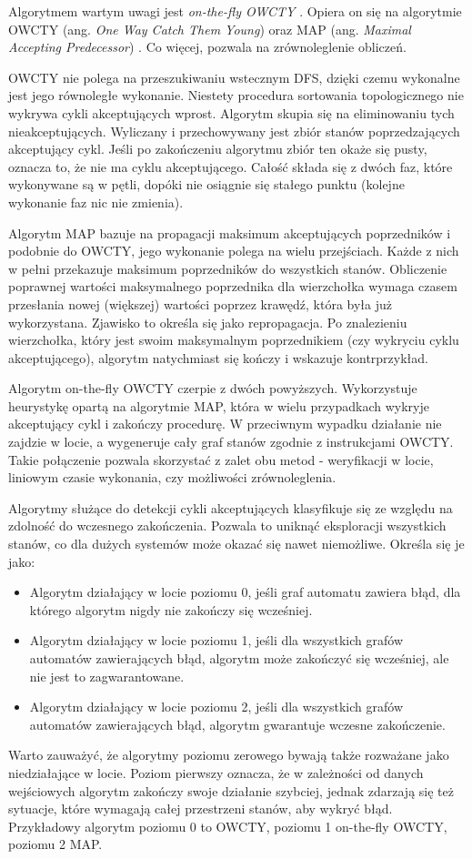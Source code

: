 Algorytmem wartym uwagi jest \textit{on-the-fly OWCTY} \cite{Bar12}.
Opiera on się na algorytmie OWCTY (ang. \textit{One Way Catch Them Young}) \cite{Cer03} oraz MAP (ang. \textit{Maximal Accepting Predecessor}) \cite{Bri04}.
Co więcej, pozwala na zrównoleglenie obliczeń.

OWCTY nie polega na przeszukiwaniu wstecznym DFS, dzięki czemu wykonalne jest jego równoległe wykonanie.
Niestety procedura sortowania topologicznego nie wykrywa cykli akceptujących wprost.
Algorytm skupia się na eliminowaniu tych nieakceptujących. 
Wyliczany i przechowywany jest zbiór stanów poprzedzających akceptujący cykl.
Jeśli po zakończeniu algorytmu zbiór ten okaże się pusty, oznacza to, że nie ma cyklu akceptującego.
Całość składa się z dwóch faz, które wykonywane są w pętli, dopóki nie osiągnie się stałego punktu (kolejne wykonanie faz nic nie zmienia).

Algorytm MAP bazuje na propagacji maksimum akceptujących poprzedników i podobnie do OWCTY, jego wykonanie polega na wielu przejściach.
Każde z nich w pełni przekazuje maksimum poprzedników do wszystkich stanów.
Obliczenie poprawnej wartości maksymalnego poprzednika dla wierzchołka wymaga czasem przesłania nowej (większej) wartości poprzez krawędź, która była już wykorzystana. Zjawisko to określa się jako repropagacja.
Po znalezieniu wierzchołka, który jest swoim maksymalnym poprzednikiem (czy wykryciu cyklu akceptującego), algorytm natychmiast się kończy i wskazuje kontrprzykład.

Algorytm on-the-fly OWCTY czerpie z dwóch powyższych.
Wykorzystuje heurystykę opartą na algorytmie MAP, która w wielu przypadkach wykryje akceptujący cykl i zakończy procedurę.
W przeciwnym wypadku działanie nie zajdzie w locie, a wygeneruje cały graf stanów zgodnie z instrukcjami OWCTY.
Takie połączenie pozwala skorzystać z zalet obu metod - weryfikacji w locie, liniowym czasie wykonania, czy możliwości zrównoleglenia.

Algorytmy służące do detekcji cykli akceptujących klasyfikuje się ze względu na zdolność do wczesnego zakończenia.
Pozwala to uniknąć eksploracji wszystkich stanów, co dla dużych systemów może okazać się nawet niemożliwe.
Określa się je jako:
\begin{itemize}
\item Algorytm działający w locie poziomu 0, jeśli graf automatu zawiera błąd, dla którego algorytm nigdy nie zakończy się wcześniej.
\item Algorytm działający w locie poziomu 1, jeśli dla wszystkich grafów automatów zawierających błąd, algorytm może zakończyć  się wcześniej, ale nie jest to zagwarantowane.
\item Algorytm działający w locie poziomu 2, jeśli dla wszystkich grafów automatów zawierających błąd, algorytm gwarantuje wczesne zakończenie.
\end{itemize}
Warto zauważyć, że algorytmy poziomu zerowego bywają także rozważane jako niedziałające w locie.
Poziom pierwszy oznacza, że w zależności od danych wejściowych algorytm zakończy swoje działanie szybciej, jednak zdarzają się też sytuacje, które wymagają całej przestrzeni stanów, aby wykryć błąd.
Przykładowy algorytm poziomu 0 to OWCTY, poziomu 1 on-the-fly OWCTY, poziomu 2 MAP.
